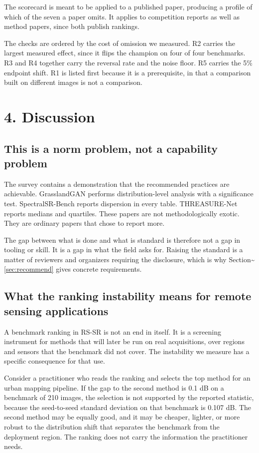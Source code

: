 \documentclass[pdflatex,sn-nature]{sn-jnl}
\begin{document}
The scorecard is meant to be applied to a published paper, producing a profile of which of the seven a paper omits. It applies to competition reports as well as method papers, since both publish rankings.

The checks are ordered by the cost of omission we measured. R2 carries the largest measured effect, since it flips the champion on four of four benchmarks. R3 and R4 together carry the reversal rate and the noise floor. R5 carries the 5\% endpoint shift. R1 is listed first because it is a prerequisite, in that a comparison built on different images is not a comparison.

\section{4. Discussion}\label{sec:discussion}

\subsection{This is a norm problem, not a capability problem}\label{sec:norm}

The survey contains a demonstration that the recommended practices are achievable. GrasslandGAN performs distribution-level analysis with a significance test. SpectralSR-Bench reports dispersion in every table. THREASURE-Net reports medians and quartiles. These papers are not methodologically exotic. They are ordinary papers that chose to report more.

The gap between what is done and what is standard is therefore not a gap in tooling or skill. It is a gap in what the field asks for. Raising the standard is a matter of reviewers and organizers requiring the disclosure, which is why Section\textasciitilde{}\ref{sec:recommend} gives concrete requirements.

\subsection{What the ranking instability means for remote sensing applications}\label{sec:applications}

A benchmark ranking in RS-SR is not an end in itself. It is a screening instrument for methods that will later be run on real acquisitions, over regions and sensors that the benchmark did not cover. The instability we measure has a specific consequence for that use.

Consider a practitioner who reads the ranking and selects the top method for an urban mapping pipeline. If the gap to the second method is 0.1 dB on a benchmark of 210 images, the selection is not supported by the reported statistic, because the seed-to-seed standard deviation on that benchmark is 0.107 dB. The second method may be equally good, and it may be cheaper, lighter, or more robust to the distribution shift that separates the benchmark from the deployment region. The ranking does not carry the information the practitioner needs.
\end{document}

